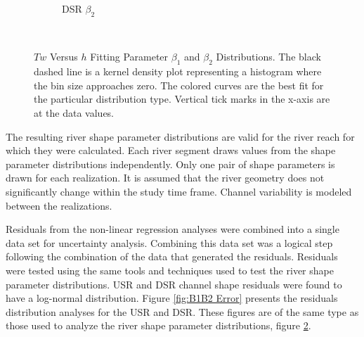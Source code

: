 \begin{linenumbers}
\begin{figure}[htbp]
\begin{subfigure}{0.5\textwidth}
	\caption{DSR $\beta_2$}
	\label{sub b2}
\end{subfigure}\\
\caption[$Tw$ Versus $h$ Fitting Parameter $\beta_1$ and $\beta_2$ Distributions.]{$Tw$ Versus $h$ Fitting Parameter $\beta_1$ and $\beta_2$ Distributions.  The black dashed line is a kernel density plot representing a histogram where the bin size approaches zero.  The colored curves are the best fit for the particular distribution type.  Vertical tick marks in the x-axis are at the data values.}
\label{fig:B1B2}
\end{figure}

The resulting river shape parameter distributions are valid for the river reach for which they were calculated.  Each river segment draws values from the shape parameter distributions independently.  Only one pair of shape parameters is drawn for each realization.  It is assumed that the river geometry does not significantly change within the study time frame.  Channel variability is modeled between the realizations.

Residuals from the non-linear regression analyses were combined into a single data set for uncertainty analysis.  Combining this data set was a logical step following the combination of the data that generated the residuals.  Residuals were tested using the same tools and techniques used to test the river shape parameter distributions.  USR and DSR channel shape residuals were found to have a log-normal distribution.  Figure \ref{fig:B1B2 Error} presents the residuals distribution analyses for the USR and DSR.  These figures are of the same type as those used to analyze the river shape parameter distributions, figure \ref{fig:B1B2}.


\end{linenumbers}
